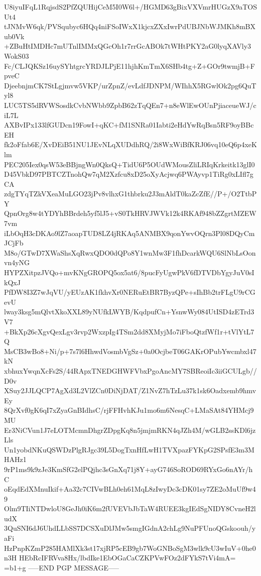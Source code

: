 U8iyuIFqL1RqjsdS2PfZQUHijCeM5I0W6l+/HGMD63gBixVXVmrHUGzX9aTOSUt4
tJNMvW6qk/PVSqubyc6HQq4niFSoIWxX1kjcxZXxIwrPdUBJNbWJMKh8mBXub0Vk
+ZBuHtIMDHc7mUTnlIMMxQGcOh1r7rrGcABOk7tWHtPKY2aG0lyqXAVly3WokS03
Fc/CLJQKSz16uySYhtgrcYRDJLPjE11hjhKmTmX6SHb4tg+Z+GOr9twmjB+FpveC
DjeebnjmCK7StLgjmvw5VKP/urZpnZ/evLdfJDNPM/WIhhX5RGwlOk2pg6QuTyl8
LUC5TS5dRVWSosdkCvbNWbb9ZpbB62zTqQEn7+n8eWlEwOUnPjiaceueWJ/ciL7L
AXBvIPx133lfGUDcn19FowI+qKC+fM1SNRa01Iabti2eHdYwRqBsn5RF9oyBBcEH
fk2oFfab6E/XvDEiB51NU1JEvNLqXUDdhRQ/2i8WxWiBfKRJ06vq10eQ6p4xeKlm
PEC205Iex0qsW53eBBjngWn0QksQ+TidU6P5OUdWMousZliLRIqKrkeitk13glI0
D45VbkD97PBTCZTnohQw7qM2Xzfcu8xD25oXyAcjwq6PWAyvp1TiRg0xLIfl7gCA
zdgTYqTZkVXeaMuLGO23jPv8vlhxG1thbrku2J3mAldT0kaZcZfE//P+/O2TtbPY
QpnOrg8w4tYDYhBBrdeh5yf5lJ5+vS0TkHRVJWVk12k4RKAf948bZZgrtMZEW7vm
iLbOqH3cDKAo9lZ7aoapTUD8LZ4jRKAq5ANMBX9qonYwvOQrn3Pl08DQyCmJCjFb
M8o/GTwD7XWaShsXqRwxQDO0dQPo8Y1wnMw3F1fhDcarkWQU6SlNbLsOonvn4yNG
HYPZXitpzJVQo+mvKNgGROPQ5ox5at6/8pucFyUgwPkV6fDTVDbYgyJuV0sIkQxJ
PfDW8I3Z7wJqVU/yEUzAK1fkhvXr0NERuEtBR7ByzQPe+sIhBb2trFLgU9rCGevU
lway3ksg5mQlvtXkoXXL89yNUfkLWYB/KqdpufCn+YsnwWy084UtISD4zETrd3V7
+BkXp26cXgvQexLgv3rvp2WxzpIg4TSm2dd8XMyjMo7iFboQtzfWf1r+tVlYtL7Q
MsCB3wBo8+Ni/p+7s7l6HhwdVosmbVgSz+0a0OcjbeT06GAKrOPubYwcmbxl47kN
xbhuxYwqnXcFs2S/44RApxTNEDGHWFVbxPgoAncMY7SBReoiIc3iiGCULgb//D0v
XSuy2JJLQCP7AgXd3L2VlZCn0DiNjDAT/Z1NvZ7hTzLu37k1sk6Oadxemb9hmvEy
8QrXvf0gK6qI7xZyaGnBIdhsC/rjFFHvhKJu1mo6m6NesqC+LMaSAt84YHMcj9MU
Er3NiCVun1J7eLOTMcmnDhgrZDpgKq8n5jmjmRKN4qJZh4M/wGLB2ssKDl6jzLls
Un1yobdNKuQSWDzPlgRJgc39L5DogTxnHfLwH1TVXpazFYKpG2SPsfE3m3MHAHz1
9rP1ms9k9zJe3KmSfG2elPQjhc3sGnXq71j8Y+ayG746SoROD69RYxGo6nAYr/hC
oEqdEdXMnuIkif+Aa32c7CIVwBLh0eh61MqL8zIwyDc3cDK01sy7ZE2oMuUf9w49
Olm9TIiNTDwloU8GeJh0iK6m2fUVEVbJbTaW4RUEE3kgIEdSgNIDY8CvneH2ludX
3QuSNI6dJ6UhdLLbSS7DCSXuDlJMw5smgIGdnA2chLg9NuPFUnoQGskoouh/yaFi
HzPnpKZmP285HAMlXk3st17xjRP5cEB9gb7WoGNBoSgM3wlk9cU3wIuV+0he0n3H
HEbRcIFRVva8Hx/lbdIke1EbOGaCaCZKPVwFOz2dFYkS7tVi4mA=
=b1+g
-----END PGP MESSAGE-----
